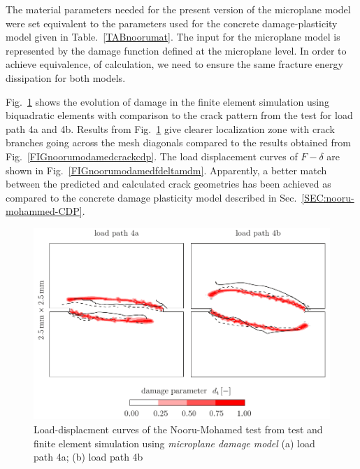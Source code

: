 \documentclass[main.tex]{subfiles}
\begin{document}
The material parameters needed for the present version of the microplane model were set equivalent to the parameters used for the concrete damage-plasticity model given in Table.~\ref{TABnoorumat}. The input for the microplane model is represented by the damage function defined at the microplane level. In order to achieve equivalence, of calculation, we need to ensure the same fracture energy dissipation for both models. 


Fig.~\ref{FIGnoorumodamedcrackmdm} shows the evolution of damage in the finite element simulation using biquadratic elements with comparison to the crack pattern from the test for load path 4a and 4b. Results from Fig.~\ref{FIGnoorumodamedcrackmdm} give clearer localization zone with crack branches going across the mesh diagonals compared to the results obtained from Fig.~\ref{FIGnoorumodamedcrackcdp}.
The load displacement curves of $F-\delta$ are shown in Fig.~\ref{FIGnoorumodamedfdeltamdm}.
Apparently, a better match between the predicted and calculated crack geometries has been achieved as compared to the concrete damage plasticity model described in Sec.~\ref{SEC:nooru-mohammed-CDP}.

\begin{figure}
\centering
\includegraphics[width=15cm]{fig/nooru-mohamed-cracks-mdm.pdf}
\caption{Load-displacment curves of the Nooru-Mohamed test from test and finite element simulation using \textit{microplane damage model} (a) load path 4a; (b) load path 4b}
\label{FIGnoorumodamedcrackmdm}
\end{figure}
\end{document}
